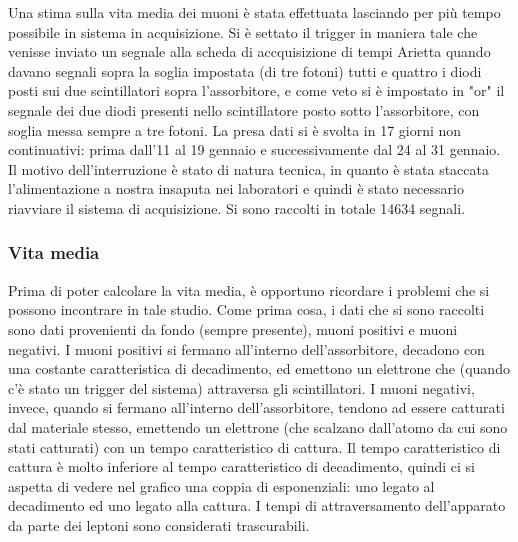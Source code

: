 Una stima sulla vita media dei muoni è stata effettuata lasciando per più tempo possibile in sistema in acquisizione. 
Si è settato il trigger in maniera tale che venisse inviato un segnale alla scheda di accquisizione di tempi Arietta quando davano segnali sopra la soglia  impostata (di tre fotoni) tutti e quattro i diodi posti sui due scintillatori sopra l'assorbitore, e come veto si è impostato in "or" il segnale dei due diodi presenti nello scintillatore posto sotto l'assorbitore, con soglia messa sempre a tre fotoni. 
La presa dati si è svolta in 17 giorni non continuativi: prima dall'11 al 19 gennaio e successivamente dal 24 al 31 gennaio. 
Il motivo dell'interruzione è stato di natura tecnica, in quanto è stata staccata l'alimentazione a nostra insaputa nei laboratori e quindi è stato necessario riavviare il sistema di acquisizione. Si sono raccolti in totale 14634 segnali.

\subsubsection{Vita media}
Prima di poter calcolare la vita  media, è opportuno ricordare i problemi che si possono incontrare in tale studio. 
Come prima cosa, i dati che si sono raccolti sono dati provenienti da fondo (sempre presente),  muoni positivi e muoni negativi. 
I muoni positivi si fermano all'interno dell'assorbitore, decadono con una costante caratteristica di decadimento, ed emettono un elettrone che (quando c'è stato un  trigger del sistema) attraversa gli scintillatori. 
I muoni negativi, invece, quando si fermano all'interno dell'assorbitore, tendono ad essere catturati dal materiale stesso, emettendo un elettrone (che scalzano dall'atomo da cui sono stati catturati) con un tempo caratteristico di cattura. 
Il tempo caratteristico di cattura è molto inferiore al tempo caratteristico di decadimento, quindi ci si aspetta di vedere nel grafico una coppia di esponenziali: uno legato al decadimento ed uno legato alla cattura. 
I tempi di attraversamento dell'apparato da parte dei leptoni sono considerati trascurabili.\\

